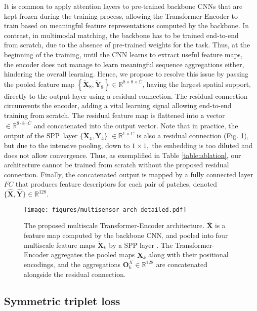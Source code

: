 \documentclass[10pt,journal]{IEEEtran}\usepackage{amsfonts}
\begin{document}
It is common to apply attention layers to pre-trained backbone CNNs that are
kept frozen during the training process, allowing the Transformer-Encoder to
train based on meaningful feature representations computed by the backbone.
In contrast, in multimodal matching, the backbone has to be trained
end-to-end from scratch, due to the absence of pre-trained weights for the
task. Thus, at the beginning of the training, until the CNN learns to
extract useful feature maps, the encoder does not manage to learn meaningful
sequence aggregations either, hindering the overall learning. Hence, we
propose to resolve this issue by passing the pooled feature map $\left\{
\mathbf{\widetilde{X}}_{8},\mathbf{\widetilde{Y}}_{8}\right\} \in \mathbb{R}^{8\times 8\times \overline{C}}$, having the largest spatial support,
directly to the output layer using a residual connection. The residual
connection circumvents the encoder, adding a vital learning signal allowing
end-to-end training from scratch. The residual feature map is flattened into
a vector $\in \mathbb{R}^{8\cdot 8\cdot \overline{C}}$ and concatenated into
the output vector. Note that in practice, the output of the SPP\ layer $\{\mathbf{\widetilde{X}}_{4},\mathbf{\widetilde{Y}}_{4}\}$ $\in \mathbb{R}^{1\times \overline{C}}$ is also a residual connection (Fig. \ref {fig:arch_detailed}), but due to the intensive pooling, down to $1\times 1,$
the embedding is too diluted and does not allow convergence. Thus, as
exemplified in Table \ref{table:ablation}, our architecture cannot be
trained from scratch without the proposed residual connection. Finally, the
concatenated output is mapped by a fully connected layer $FC$ that produces
feature descriptors for each pair of patches, denoted $\{\mathbf{\widehat{X}},\mathbf{\widehat{Y}}\}\in \mathbb{R}^{128}$.
\begin{figure}[t]
\caption{The proposed multiscale Transformer-Encoder architecture. $\overline{\mathbf{X}}$ is a feature map computed by the backbone CNN, and
pooled into four multiscale feature maps $\mathbf{\widetilde{X}}_{k}$ by a
SPP layer \protect\cite{SPP}. The Transformer-Encoder aggregates the pooled
maps $\mathbf{\widetilde{X}}_{k}$ along with their positional encodings, and
the aggregations $\mathbf{O}_{k}^{X}\in
\mathbb{R}
^{128}$ are concatenated alongside the residual connection.}
\label{fig:arch_detailed}\centering\texttt{[image: figures/multisensor\_arch\_detailed.pdf]}
\end{figure}

\subsection{Symmetric triplet loss}
\end{document}
